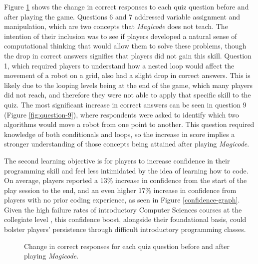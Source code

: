 \documentclass[10pt,twocolumn]{article}
\begin{document}
Figure \ref{quiz-score-graph} shows the change in correct responses to each quiz question before and after playing the game. Questions 6 and 7 addressed variable assignment and manipulation, which are two concepts that \textit{Magicode} does not teach. The intention of their inclusion was to see if players developed a natural sense of computational thinking that would allow them to solve these problems, though the drop in correct answers signifies that players did not gain this skill. Question 1, which required players to understand how a nested loop would affect the movement of a robot on a grid, also had a slight drop in correct answers. This is likely due to the looping levels being at the end of the game, which many players did not reach, and therefore they were not able to apply that specific skill to the quiz. The most significant increase in correct answers can be seen in question 9 (Figure \ref{fig:question-9}), where respondents were asked to identify which two algorithms would move a robot from one point to another. This question required knowledge of both conditionals and loops, so the increase in score implies a stronger understanding of those concepts being attained after playing \textit{Magicode}.

The second learning objective is for players to increase confidence in their programming skill and feel less intimidated by the idea of learning how to code. On average, players reported a 13\% increase in confidence from the start of the play session to the end, and an even higher 17\% increase in confidence from players with no prior coding experience, as seen in Figure \ref{confidence-graph}. Given the high failure rates of introductory Computer Sciences courses at the collegiate level \cite{failure-rates}, this confidence boost,  alongside their foundational basis, could bolster players’ persistence through difficult introductory programming classes.


\begin{figure}
    \centering
    \caption{Change in correct responses for each quiz question before and after playing \textit{Magicode}.}
    \label{quiz-score-graph}
\end{figure}
\end{document}
